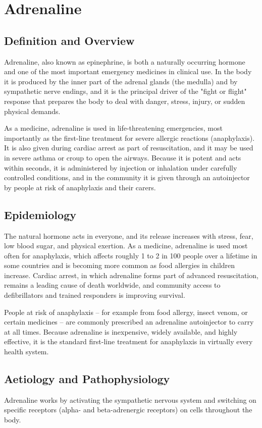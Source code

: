 \chapter{Adrenaline}

\section*{Definition and Overview}
Adrenaline, also known as epinephrine, is both a naturally occurring hormone and one of the most important emergency medicines in clinical use. In the body it is produced by the inner part of the adrenal glands (the medulla) and by sympathetic nerve endings, and it is the principal driver of the "fight or flight" response that prepares the body to deal with danger, stress, injury, or sudden physical demands.

As a medicine, adrenaline is used in life-threatening emergencies, most importantly as the first-line treatment for severe allergic reactions (anaphylaxis). It is also given during cardiac arrest as part of resuscitation, and it may be used in severe asthma or croup to open the airways. Because it is potent and acts within seconds, it is administered by injection or inhalation under carefully controlled conditions, and in the community it is given through an autoinjector by people at risk of anaphylaxis and their carers.

\section*{Epidemiology}
The natural hormone acts in everyone, and its release increases with stress, fear, low blood sugar, and physical exertion. As a medicine, adrenaline is used most often for anaphylaxis, which affects roughly 1 to 2 in 100 people over a lifetime in some countries and is becoming more common as food allergies in children increase. Cardiac arrest, in which adrenaline forms part of advanced resuscitation, remains a leading cause of death worldwide, and community access to defibrillators and trained responders is improving survival.

People at risk of anaphylaxis -- for example from food allergy, insect venom, or certain medicines -- are commonly prescribed an adrenaline autoinjector to carry at all times. Because adrenaline is inexpensive, widely available, and highly effective, it is the standard first-line treatment for anaphylaxis in virtually every health system.

\section*{Aetiology and Pathophysiology}
Adrenaline works by activating the sympathetic nervous system and switching on specific receptors (alpha- and beta-adrenergic receptors) on cells throughout the body.

